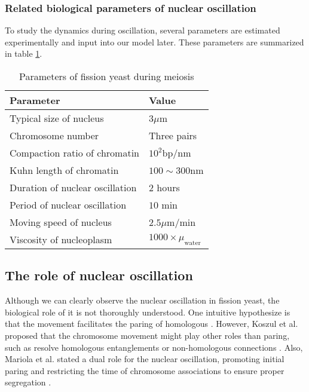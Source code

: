 \subsubsection{Related biological parameters of nuclear oscillation}
To study the dynamics during oscillation, several parameters are estimated experimentally and input into our model later. These parameters are summarized in table \ref{tab:parameters}.

\begin{table}[htpb]
    \centering
    \caption{Parameters of fission yeast during meiosis}
    \label{tab:parameters}
    \begin{tabular}{l|l}
        \hline
        \textbf{Parameter} & \textbf{Value} \\
        \hline
        Typical size of nucleus          &  $3\mu$m \\
        Chromosome number                &  Three pairs \\
        Compaction ratio of chromatin    &  $10^2$bp/nm \\
        Kuhn length of chromatin         &  $100\sim300$nm  \\
        Duration of nuclear oscillation  &  $2$ hours  \\
        Period of nuclear oscillation    &  $10$ min  \\
        Moving speed of nucleus          &  $2.5\mu$m/min \\
        Viscosity of nucleoplasm         &  $1000\times \mu_{\text{water}}$ \\
        \hline
    \end{tabular}
\end{table}


\subsection{The role of nuclear oscillation}
\label{sub:the_role_of_nuclear_oscillation}

Although we can clearly observe the nuclear oscillation in fission yeast, the biological role of it is not thoroughly understood. One intuitive hypothesize is that the movement facilitates the paring of homologous \cite{Ding2004}. However, Koszul et al. proposed that the chromosome movement might play other roles than paring, such as resolve homologous entanglements or non-homologous connections \cite{Koszul2009a}. Also, Mariola et al. stated a dual role for the nuclear oscillation, promoting initial paring and restricting the time of chromosome associations to ensure proper segregation \cite{Chacon2016}. 

